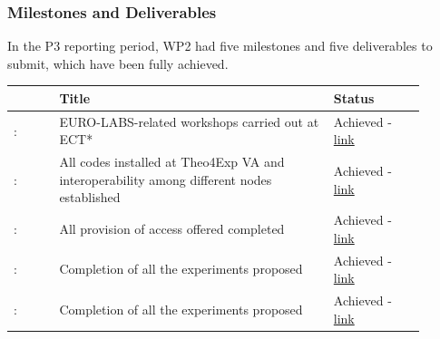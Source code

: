 

\subsubsection*{Milestones and Deliverables}
In the P3 reporting period, WP2 had five milestones and five deliverables to submit, which have been fully achieved.
{\fontsize{9}{11}\selectfont
\begin{center}
  {\color{black}\begin{tabular}[t]{!{\color{mygray}\vrule}p{0.10\linewidth}!
  {\color{mygray}\vrule}p{0.60\linewidth}!
  {\color{mygray}\vrule}p{0.20\linewidth}!{\color{mygray}\vrule} } \hline
     & {\bf Title} & {\bf Status} \\ \hline
    : &EURO-LABS-related workshops carried out at ECT* &  Achieved - \href{https://web.infn.it/EURO-LABS/wp-content/uploads/2026/03/EURO-LABS_MS9_ECT_Final.pdf} {link}  \\ \hline
    : & All codes installed at Theo4Exp VA and interoperability among different nodes established & Achieved - \href{https://web.infn.it/EURO-LABS/wp-content/uploads/2026/04/EURO-LABS_MS11_Theo4Exp_Report.pdf}{link} \\ \hline    
    : & All provision of access offered completed & Achieved - \href{https://web.infn.it/EURO-LABS/wp-content/uploads/2026/07/EURO-LABS_MS3_Report.pdf}{link} \\ \hline 
    : & Completion of all the experiments proposed & Achieved - \href{https://web.infn.it/EURO-LABS/wp-content/uploads/2026/07/EURO-LABS_MS5_Report.pdf}{link} \\ \hline 
    : & 	Completion of all the experiments proposed & Achieved - \href{https://web.infn.it/EURO-LABS/wp-content/uploads/2026/07/EURO-LABS_MS7_Report.pdf}{link} \\ \hline 


\end{tabular}}
\end{center}}
